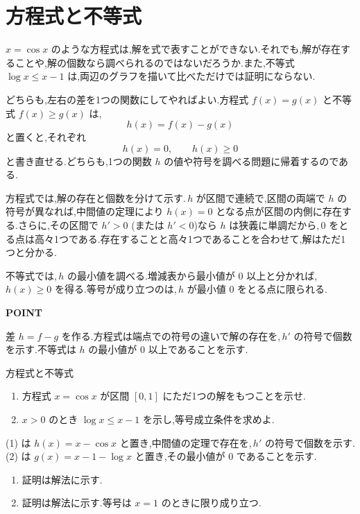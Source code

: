 \section{方程式と不等式}\label{節:微分方程式不等式}
$x=\cos x$ のような方程式は,解を式で表すことができない.それでも,解が存在することや,解の個数なら調べられるのではないだろうか.また,不等式 $\log x\le x-1$ は,両辺のグラフを描いて比べただけでは証明にならない.

どちらも,左右の差を1つの関数にしてやればよい.方程式 $f(x)=g(x)$ と不等式 $f(x)\ge g(x)$ は,
\[
 h(x)=f(x)-g(x)
\]
と置くと,それぞれ
\[
 h(x)=0,\qquad h(x)\ge0
\]
と書き直せる.どちらも,1つの関数 $h$ の値や符号を調べる問題に帰着するのである.

方程式では,解の存在と個数を分けて示す.\,$h$ が区間で連続で,区間の両端で $h$ の符号が異なれば,中間値の定理により $h(x)=0$ となる点が区間の内側に存在する.さらに,その区間で $h'>0$ (または $h'<0$)なら $h$ は狭義に単調だから,\,$0$ をとる点は高々1つである.存在することと高々1つであることを合わせて,解はただ1つと分かる.

不等式では,\,$h$ の最小値を調べる.増減表から最小値が $0$ 以上と分かれば,\,$h(x)\ge0$ を得る.等号が成り立つのは,\,$h$ が最小値 $0$ をとる点に限られる.

\begin{bookpoint}
\textbf{POINT}\par
差 $h=f-g$ を作る.方程式は端点での符号の違いで解の存在を,\,$h'$ の符号で個数を示す.不等式は $h$ の最小値が $0$ 以上であることを示す.
\end{bookpoint}

\begin{example}{方程式と不等式}
\begin{enumerate}[label=(\arabic*),leftmargin=*]
 \item 方程式 $x=\cos x$ が区間 $[0,1]$ にただ1つの解をもつことを示せ.
 \item $x>0$ のとき $\log x\le x-1$ を示し,等号成立条件を求めよ.
\end{enumerate}
\end{example}
(1) は $h(x)=x-\cos x$ と置き,中間値の定理で存在を,\,$h'$ の符号で個数を示す.(2) は $g(x)=x-1-\log x$ と置き,その最小値が $0$ であることを示す.

\begin{enumerate}[label=(\arabic*),leftmargin=*]
 \item 証明は解法に示す.
 \item 証明は解法に示す.等号は $x=1$ のときに限り成り立つ.
\end{enumerate}


